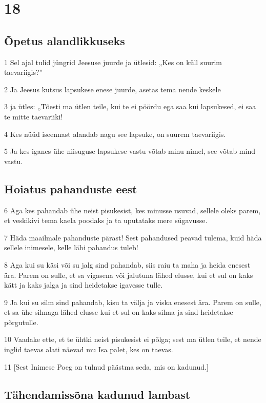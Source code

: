 \chapter{18}

\section*{Õpetus alandlikkuseks}

\par 1 Sel ajal tulid jüngrid Jeesuse juurde ja ütlesid: „Kes on küll suurim taevariigis?”
\par 2 Ja Jeesus kutsus lapsukese enese juurde, asetas tema nende keskele
\par 3 ja ütles: „Tõesti ma ütlen teile, kui te ei pöördu ega saa kui lapsukesed, ei saa te mitte taevariiki!
\par 4 Kes nüüd iseennast alandab nagu see lapsuke, on suurem taevariigis.
\par 5 Ja kes iganes ühe niisuguse lapsukese vastu võtab minu nimel, see võtab mind vastu.

\section*{Hoiatus pahanduste eest}

\par 6 Aga kes pahandab ühe neist pisukesist, kes minusse usuvad, sellele oleks parem, et veskikivi tema kaela poodaks ja ta uputataks mere sügavusse.
\par 7 Häda maailmale pahanduste pärast! Sest pahandused peavad tulema, kuid häda sellele inimesele, kelle läbi pahandus tuleb!
\par 8 Aga kui su käsi või su jalg sind pahandab, siis raiu ta maha ja heida enesest ära. Parem on sulle, et sa vigasena või jalutuna lähed elusse, kui et sul on kaks kätt ja kaks jalga ja sind heidetakse igavesse tulle.
\par 9 Ja kui su silm sind pahandab, kisu ta välja ja viska enesest ära. Parem on sulle, et sa ühe silmaga lähed elusse kui et sul on kaks silma ja sind heidetakse põrgutulle.
\par 10 Vaadake ette, et te ühtki neist pisukesist ei põlga; sest ma ütlen teile, et nende inglid taevas alati näevad mu Isa palet, kes on taevas.
\par 11 [Sest Inimese Poeg on tulnud päästma seda, mis on kadunud.]

\section*{Tähendamissõna kadunud lambast}

